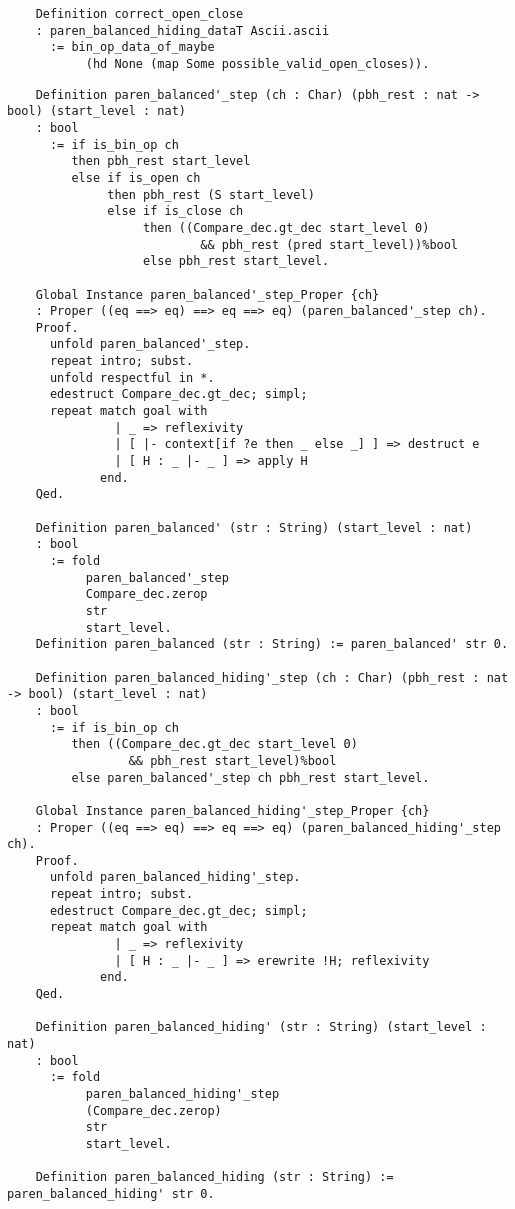 \begin{verbatim}
    Definition correct_open_close
    : paren_balanced_hiding_dataT Ascii.ascii
      := bin_op_data_of_maybe
           (hd None (map Some possible_valid_open_closes)).

\end{verbatim}

\begin{verbatim}
    Definition paren_balanced'_step (ch : Char) (pbh_rest : nat -> bool) (start_level : nat)
    : bool
      := if is_bin_op ch
         then pbh_rest start_level
         else if is_open ch
              then pbh_rest (S start_level)
              else if is_close ch
                   then ((Compare_dec.gt_dec start_level 0)
                           && pbh_rest (pred start_level))%bool
                   else pbh_rest start_level.

    Global Instance paren_balanced'_step_Proper {ch}
    : Proper ((eq ==> eq) ==> eq ==> eq) (paren_balanced'_step ch).
    Proof.
      unfold paren_balanced'_step.
      repeat intro; subst.
      unfold respectful in *.
      edestruct Compare_dec.gt_dec; simpl;
      repeat match goal with
               | _ => reflexivity
               | [ |- context[if ?e then _ else _] ] => destruct e
               | [ H : _ |- _ ] => apply H
             end.
    Qed.

    Definition paren_balanced' (str : String) (start_level : nat)
    : bool
      := fold
           paren_balanced'_step
           Compare_dec.zerop
           str
           start_level.
    Definition paren_balanced (str : String) := paren_balanced' str 0.

    Definition paren_balanced_hiding'_step (ch : Char) (pbh_rest : nat -> bool) (start_level : nat)
    : bool
      := if is_bin_op ch
         then ((Compare_dec.gt_dec start_level 0)
                 && pbh_rest start_level)%bool
         else paren_balanced'_step ch pbh_rest start_level.

    Global Instance paren_balanced_hiding'_step_Proper {ch}
    : Proper ((eq ==> eq) ==> eq ==> eq) (paren_balanced_hiding'_step ch).
    Proof.
      unfold paren_balanced_hiding'_step.
      repeat intro; subst.
      edestruct Compare_dec.gt_dec; simpl;
      repeat match goal with
               | _ => reflexivity
               | [ H : _ |- _ ] => erewrite !H; reflexivity
             end.
    Qed.

    Definition paren_balanced_hiding' (str : String) (start_level : nat)
    : bool
      := fold
           paren_balanced_hiding'_step
           (Compare_dec.zerop)
           str
           start_level.

    Definition paren_balanced_hiding (str : String) := paren_balanced_hiding' str 0.

\end{verbatim}